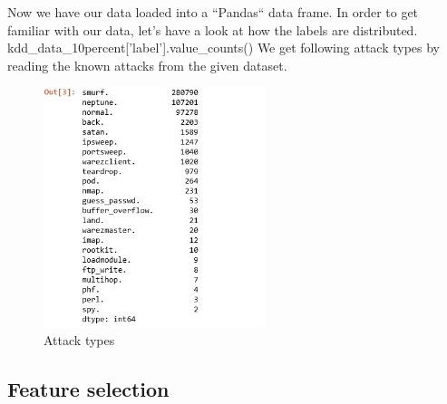 Now we have our data loaded into a ``Pandas`` data frame. In order to get familiar with our data, let's have a look at how the labels are distributed. 
kdd\_data\_10percent['label'].value\_counts()
We get following attack types by reading the known attacks from the given dataset.
\begin{figure}[h]
    \centering
    \includegraphics[height=7cm]{texfiles/images/code3.jpg}
    \caption{Attack types}
    \label{fig:code3}
\end{figure}
\subsection{Feature selection}

